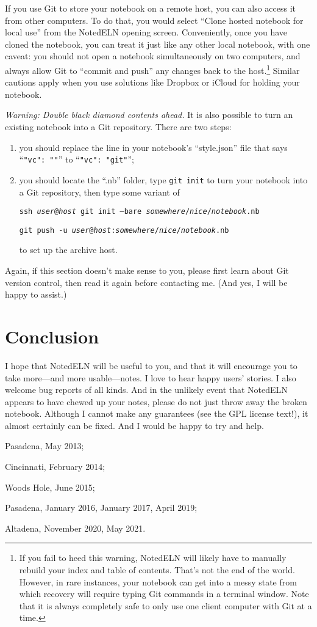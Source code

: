 \documentclass[11pt]{report}
\def\terminal#1{{\tt#1}}
\begin{document}
If you use Git to store your notebook on a remote host,
you can also access it from other computers. To do that, you would
select ``Clone hosted notebook for local use'' from the NotedELN opening
screen. Conveniently, once you have cloned the notebook, you can treat
it just like any other local notebook, with one caveat: you should not
open a notebook simultaneously on two computers, and always allow Git
to ``commit and push'' any changes back to the host.\footnote{If you fail to
heed this warning, NotedELN will likely have to manually rebuild your index
and table of contents. That's not the end of the world. However, in
rare instances, your notebook can get into a messy state from which
recovery will require typing Git commands in a terminal window. Note
that it is always completely safe to only use one client computer with
Git at a time.} Similar cautions apply when you use solutions like
Dropbox or iCloud for holding your notebook.

\emph{Warning: Double black diamond contents ahead.} It is also
possible to turn an existing notebook into a Git repository. There are
two steps:
\begin{enumerate}
  \item you should replace the line in your notebook's
    ``style.json'' file that says ``{\tt"vc":~""}'' to ``{\tt"vc":~"git"}'';
    \item you
should locate the ``.nb'' folder, type \terminal{git init} to turn your
notebook into a Git repository, then type some variant of

\terminal{ssh
\emph{user}@\emph{host} git init --bare
\emph{somewhere}/\emph{nice}/\emph{notebook}.nb}\vspace{-5pt}

\terminal{git push -u
\emph{user}@\emph{host}:\emph{somewhere}/\emph{nice}/\emph{notebook}.nb}

to set up the archive host.
\end{enumerate}
Again, if this section doesn't make sense to you, please first learn
about Git version control, then read it again before
contacting me. (And yes, I will be happy to assist.)

\section{Conclusion}

I hope that NotedELN will be useful to you, and that it will encourage you
to take more---and more usable---notes. I love to hear happy users'
stories. I also welcome bug reports of all kinds. And in the unlikely
event that NotedELN appears to have chewed up your notes, please do not
just throw away the broken notebook. Although I cannot make any
guarantees (see the GPL license text!), it almost certainly can be
fixed. And I would be happy to try and help.

\bigskip

\noindent Pasadena, May 2013;

\noindent Cincinnati, February 2014;

\noindent Woods Hole, June 2015;

\noindent Pasadena, January 2016, January 2017, April 2019;

\noindent Altadena, November 2020, May 2021.
\end{document}
